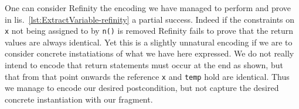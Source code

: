 One can consider Refinity the encoding we have managed to perform and prove in lis.~\ref{lst:ExtractVariable-refinity} a partial success. Indeed if the constraints on
\lstinline[style=refinity]|x| not being assigned to by \lstinline[style=refinity]|n()| is removed Refinity fails to prove that the return values are always identical.
Yet this is a slightly unnatural encoding if we are to consider concrete instatiations of what we have here expressed. We do not really intend to encode that return
statements must occur at the end as shown, but that from that point onwards the reference \lstinline[style=refinity]|x| and \lstinline[style=refinity]|temp| hold
are identical. Thus we manage to encode our desired postcondition, but not capture the desired concrete instantiation with our fragment.
